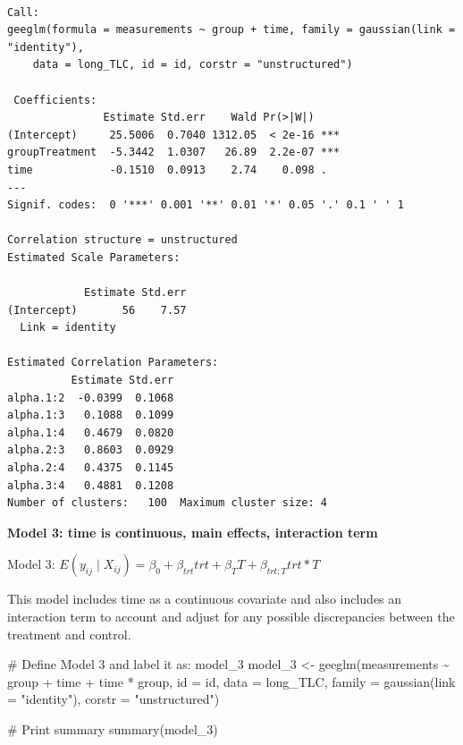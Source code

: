 \documentclass[
  letterpaper,
  DIV=11,
  numbers=noendperiod]{scrreprt}
\newenvironment{Shaded}{\begin{snugshade}}{\end{snugshade}}
\newcommand{\AttributeTok}[1]{\textcolor[rgb]{0.40,0.45,0.13}{#1}}
\newcommand{\CommentTok}[1]{\textcolor[rgb]{0.37,0.37,0.37}{#1}}
\newcommand{\FunctionTok}[1]{\textcolor[rgb]{0.28,0.35,0.67}{#1}}
\newcommand{\NormalTok}[1]{\textcolor[rgb]{0.00,0.23,0.31}{#1}}
\newcommand{\OtherTok}[1]{\textcolor[rgb]{0.00,0.23,0.31}{#1}}
\newcommand{\SpecialCharTok}[1]{\textcolor[rgb]{0.37,0.37,0.37}{#1}}
\newcommand{\StringTok}[1]{\textcolor[rgb]{0.13,0.47,0.30}{#1}}
\begin{document}
\begin{verbatim}

Call:
geeglm(formula = measurements ~ group + time, family = gaussian(link = "identity"), 
    data = long_TLC, id = id, corstr = "unstructured")

 Coefficients:
               Estimate Std.err    Wald Pr(>|W|)    
(Intercept)     25.5006  0.7040 1312.05  < 2e-16 ***
groupTreatment  -5.3442  1.0307   26.89  2.2e-07 ***
time            -0.1510  0.0913    2.74    0.098 .  
---
Signif. codes:  0 '***' 0.001 '**' 0.01 '*' 0.05 '.' 0.1 ' ' 1

Correlation structure = unstructured 
Estimated Scale Parameters:

            Estimate Std.err
(Intercept)       56    7.57
  Link = identity 

Estimated Correlation Parameters:
          Estimate Std.err
alpha.1:2  -0.0399  0.1068
alpha.1:3   0.1088  0.1099
alpha.1:4   0.4679  0.0820
alpha.2:3   0.8603  0.0929
alpha.2:4   0.4375  0.1145
alpha.3:4   0.4881  0.1208
Number of clusters:   100  Maximum cluster size: 4 
\end{verbatim}

\textbf{Model 3: time is continuous, main effects, interaction term}

Model 3:
\(E(y_{ij} \mid X_{ij}) = \beta_0 + \beta_{trt}trt + \beta_{T}T + \beta_{trt:T}trt*T\)

This model includes time as a continuous covariate and also includes an
interaction term to account and adjust for any possible discrepancies
between the treatment and control.

\begin{Shaded}
\begin{Highlighting}[]
\CommentTok{\# Define Model 3 and label it as: model\_3}
\NormalTok{model\_3 }\OtherTok{\textless{}{-}} \FunctionTok{geeglm}\NormalTok{(measurements }\SpecialCharTok{\textasciitilde{}}\NormalTok{ group }\SpecialCharTok{+}\NormalTok{ time }\SpecialCharTok{+}\NormalTok{ time }\SpecialCharTok{*}\NormalTok{ group, }\AttributeTok{id =}\NormalTok{ id, }\AttributeTok{data =}\NormalTok{ long\_TLC,}
    \AttributeTok{family =} \FunctionTok{gaussian}\NormalTok{(}\AttributeTok{link =} \StringTok{"identity"}\NormalTok{), }\AttributeTok{corstr =} \StringTok{"unstructured"}\NormalTok{)}

\CommentTok{\# Print summary}
\FunctionTok{summary}\NormalTok{(model\_3)}
\end{Highlighting}
\end{Shaded}
\end{document}

